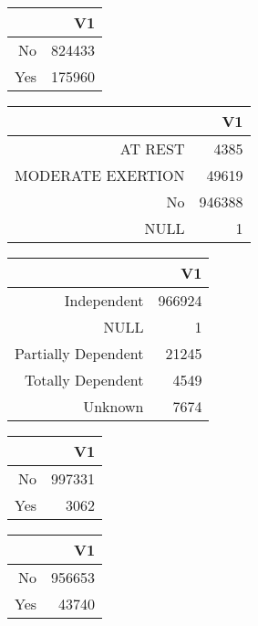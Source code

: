 \bigskip\bigskip
\centering
\begin{tabular}{rr}
  \hline
 & V1 \\ 
  \hline
No & 824433 \\ 
  Yes & 175960 \\ 
   \hline
\end{tabular}

\bigskip\bigskip
\centering
\begin{tabular}{rr}
  \hline
 & V1 \\ 
  \hline
AT REST & 4385 \\ 
  MODERATE EXERTION & 49619 \\ 
  No & 946388 \\ 
  NULL &   1 \\ 
   \hline
\end{tabular}

\bigskip\bigskip
\centering
\begin{tabular}{rr}
  \hline
 & V1 \\ 
  \hline
Independent & 966924 \\ 
  NULL &   1 \\ 
  Partially Dependent & 21245 \\ 
  Totally Dependent & 4549 \\ 
  Unknown & 7674 \\ 
   \hline
\end{tabular}

\bigskip\bigskip
\centering
\begin{tabular}{rr}
  \hline
 & V1 \\ 
  \hline
No & 997331 \\ 
  Yes & 3062 \\ 
   \hline
\end{tabular}

\bigskip\bigskip
\centering
\begin{tabular}{rr}
  \hline
 & V1 \\ 
  \hline
No & 956653 \\ 
  Yes & 43740 \\ 
   \hline
\end{tabular}


